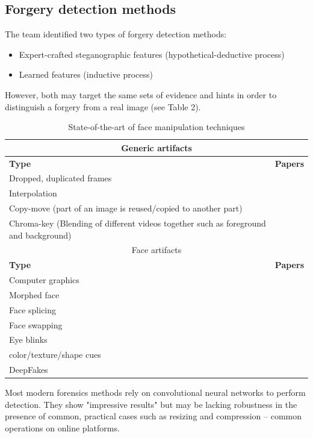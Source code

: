 \documentclass{article} %
\begin{document}
\subsection{Forgery detection methods}

The team identified two types of forgery detection methods:
\begin{itemize}
    \item Expert-crafted steganographic features (hypothetical-deductive process)
    \item Learned features (inductive process)
\end{itemize}

However, both may target the same sets of evidence and hints in order to distinguish a forgery from a real image (see Table 2).

\begin{table}[h!]
\centering
\begin{tabular}{ |p{8.5cm}|p{4cm}|  }
 \hline
 \multicolumn{2}{|c|}{Generic artifacts} \\
 \hline
 \textbf{Type} & \textbf{Papers} \\
 \hline
 Dropped, duplicated frames & \cite{8014971} \\
 Interpolation & \cite{7869361} \\
 Copy-move (\footnotesize{part of an image is reused/copied to another part}) & \cite{8288661} \\
 Chroma-key (\footnotesize{Blending of different videos together such as foreground and background}) & \cite{8296533} \\
 \hline
 \multicolumn{2}{|c|}{Face artifacts} \\
 \hline
 \textbf{Type} & \textbf{Papers} \\
 \hline
 Computer graphics & \cite{8267647} \\
 Morphed face & \cite{8014962} \\
 Face splicing & \cite{7349174} \\
 Face swapping & \cite{8014963} \\
 Eye blinks & \cite{8630787} \\
 color/texture/shape cues & \cite{7349174} \\
 DeepFakes & \cite{8639163} \\
 \hline
\end{tabular}
\caption{State-of-the-art of face manipulation techniques}
\end{table}

Most modern forensics methods rely on convolutional neural networks to perform detection. They show "impressive results" but may be lacking robustness in the presence of common, practical cases such as resizing and compression -- common operations on online platforms. 
\end{document}
